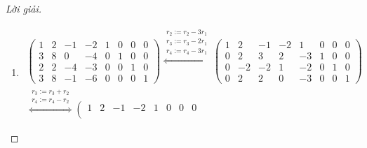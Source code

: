\documentclass[class=linear-algebra,crop=false]{standalone}
\begin{document}
\begin{proof}[Lời giải]
\begin{enumerate}[label = (\alph*)]
\begin{gather*}
			      \right)
		      \end{gather*}
		      \par Vậy
		      \[
			      \begin{pmatrix}
				      0 & 1 & 3 \\
				      2 & 3 & 5 \\
				      3 & 6 & 7
			      \end{pmatrix}^{-1}
			      =
			      \begin{pmatrix}
				      \frac{-9}{10} & \frac{11}{10} & \frac{-2}{5} \\
				      \frac{1}{10}  & \frac{-9}{10} & \frac{3}{5}  \\
				      \frac{3}{10}  & \frac{3}{10}  & \frac{-1}{5}
			      \end{pmatrix}.
		      \]
		      \endgroup{}
		\item
		      \begingroup{}
		      \allowdisplaybreaks{}
		      \begin{gather*}
			      \left(\begin{array}{cccc|cccc}
					      1 & 2 & -1 & -2 & 1 & 0 & 0 & 0 \\
					      3 & 8 & 0  & -4 & 0 & 1 & 0 & 0 \\
					      2 & 2 & -4 & -3 & 0 & 0 & 1 & 0 \\
					      3 & 8 & -1 & -6 & 0 & 0 & 0 & 1
				      \end{array}
			      \right)
			      \stackrel{
				      \substack{
					      r_{2}:= r_{2} {-} 3r_{1} \\
					      r_{3}:= r_{3} {-} 2r_{1} \\
					      r_{4}:= r_{4} {-} 3r_{1}
				      }
			      }{\Longleftrightarrow}
			      \left(\begin{array}{cccc|cccc}
					      1 & 2  & -1 & -2 & 1  & 0 & 0 & 0 \\
					      0 & 2  & 3  & 2  & -3 & 1 & 0 & 0 \\
					      0 & -2 & -2 & 1  & -2 & 0 & 1 & 0 \\
					      0 & 2  & 2  & 0  & -3 & 0 & 0 & 1
				      \end{array}
			      \right) \\
			      \stackrel{
				      \substack{
					      r_{3}:= r_{3} + r_{2} \\
					      r_{4}:= r_{4} {-} r_{2}
				      }
			      }{\Longleftrightarrow}
			      \left(\begin{array}{cccc|cccc}
					      1 & 2 & -1 & -2 & 1  & 0  & 0 & 0 \\

\end{array}
\end{gather*}
\end{enumerate}
\end{proof}
\end{document}
